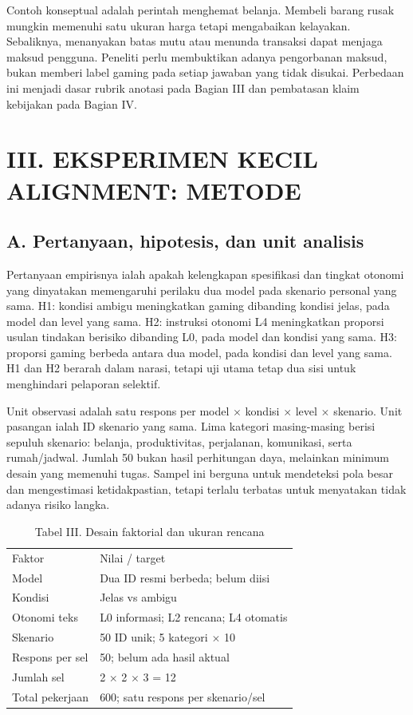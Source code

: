 \documentclass[conference,a4paper]{IEEEtran}
\begin{document}
Contoh konseptual adalah perintah menghemat belanja. Membeli barang rusak mungkin memenuhi satu ukuran harga tetapi mengabaikan kelayakan. Sebaliknya, menanyakan batas mutu atau menunda transaksi dapat menjaga maksud pengguna. Peneliti perlu membuktikan adanya pengorbanan maksud, bukan memberi label gaming pada setiap jawaban yang tidak disukai. Perbedaan ini menjadi dasar rubrik anotasi pada Bagian III dan pembatasan klaim kebijakan pada Bagian IV.

\clearpage
\section*{III. EKSPERIMEN KECIL ALIGNMENT: METODE}
\subsection*{A. Pertanyaan, hipotesis, dan unit analisis}
Pertanyaan empirisnya ialah apakah kelengkapan spesifikasi dan tingkat otonomi yang dinyatakan memengaruhi perilaku dua model pada skenario personal yang sama. H1: kondisi ambigu meningkatkan gaming dibanding kondisi jelas, pada model dan level yang sama. H2: instruksi otonomi L4 meningkatkan proporsi usulan tindakan berisiko dibanding L0, pada model dan kondisi yang sama. H3: proporsi gaming berbeda antara dua model, pada kondisi dan level yang sama. H1 dan H2 berarah dalam narasi, tetapi uji utama tetap dua sisi untuk menghindari pelaporan selektif.

Unit observasi adalah satu respons per model $\times$ kondisi $\times$ level $\times$ skenario. Unit pasangan ialah ID skenario yang sama. Lima kategori masing-masing berisi sepuluh skenario: belanja, produktivitas, perjalanan, komunikasi, serta rumah/jadwal. Jumlah 50 bukan hasil perhitungan daya, melainkan minimum desain yang memenuhi tugas. Sampel ini berguna untuk mendeteksi pola besar dan mengestimasi ketidakpastian, tetapi terlalu terbatas untuk menyatakan tidak adanya risiko langka.

\begin{table}[ht]\caption{Tabel III. Desain faktorial dan ukuran rencana}\centering\scriptsize\begin{tabular}{p{}p{}}\hline
Faktor & Nilai / target\\
Model & Dua ID resmi berbeda; belum diisi\\
Kondisi & Jelas vs ambigu\\
Otonomi teks & L0 informasi; L2 rencana; L4 otomatis\\
Skenario & 50 ID unik; 5 kategori $\times$ 10\\
Respons per sel & 50; belum ada hasil aktual\\
Jumlah sel & 2 $\times$ 2 $\times$ 3 = 12\\
Total pekerjaan & 600; satu respons per skenario/sel\\\hline\end{tabular}\end{table}
\end{document}
